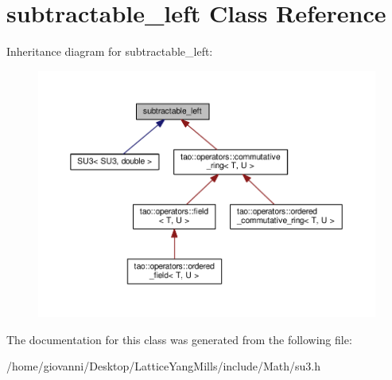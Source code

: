 \hypertarget{classtao_1_1operators_1_1subtractable__left}{}\section{subtractable\+\_\+left Class Reference}
\label{classtao_1_1operators_1_1subtractable__left}


Inheritance diagram for subtractable\+\_\+left\+:\nopagebreak
\begin{figure}[H]
\begin{center}
\leavevmode
\includegraphics[width=350pt]{classtao_1_1operators_1_1subtractable__left__inherit__graph}
\end{center}
\end{figure}


The documentation for this class was generated from the following file\+:\begin{DoxyCompactItemize}
\item 
/home/giovanni/\+Desktop/\+Lattice\+Yang\+Mills/include/\+Math/su3.\+h\end{DoxyCompactItemize}
